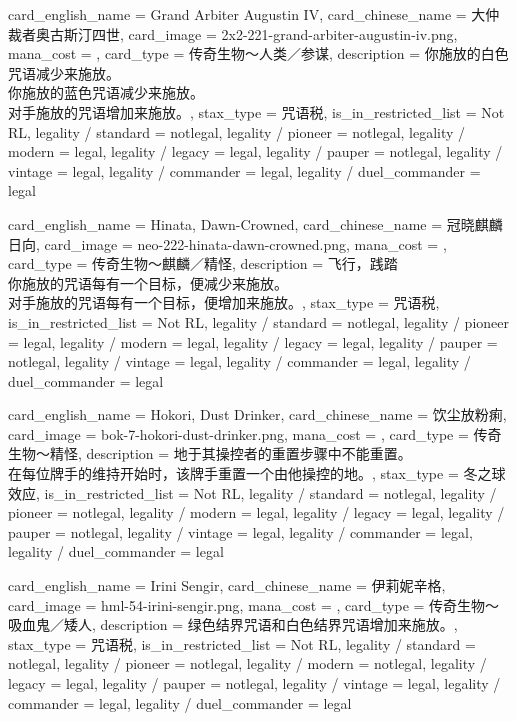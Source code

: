 \documentclass[lang = cn, color = black, 10pt]{AllThatStax}
\begin{document}
\card
{
	card_english_name = {Grand Arbiter Augustin IV},
	card_chinese_name = {大仲裁者奥古斯汀四世},
	card_image = 2x2-221-grand-arbiter-augustin-iv.png,
	mana_cost = ,
	card_type = 传奇生物～人类／参谋,
	description = {你施放的白色咒语减少来施放。\\
你施放的蓝色咒语减少来施放。\\
对手施放的咒语增加来施放。},
	stax_type = 咒语税,
	is_in_restricted_list = Not RL,
	legality / standard = notlegal,
	legality / pioneer = notlegal,
	legality / modern = legal,
	legality / legacy = legal,
	legality / pauper = notlegal,
	legality / vintage = legal,
	legality / commander = legal,
	legality / duel_commander = legal
}

\card
{
	card_english_name = {Hinata, Dawn-Crowned},
	card_chinese_name = {冠晓麒麟日向},
	card_image = neo-222-hinata-dawn-crowned.png,
	mana_cost = ,
	card_type = 传奇生物～麒麟／精怪,
	description = {飞行，践踏\\
你施放的咒语每有一个目标，便减少来施放。\\
对手施放的咒语每有一个目标，便增加来施放。},
	stax_type = 咒语税,
	is_in_restricted_list = Not RL,
	legality / standard = notlegal,
	legality / pioneer = legal,
	legality / modern = legal,
	legality / legacy = legal,
	legality / pauper = notlegal,
	legality / vintage = legal,
	legality / commander = legal,
	legality / duel_commander = legal
}

\card
{
	card_english_name = {Hokori, Dust Drinker},
	card_chinese_name = {饮尘放粉痢},
	card_image = bok-7-hokori-dust-drinker.png,
	mana_cost = ,
	card_type = 传奇生物～精怪,
	description = {地于其操控者的重置步骤中不能重置。\\
在每位牌手的维持开始时，该牌手重置一个由他操控的地。},
	stax_type = 冬之球效应,
	is_in_restricted_list = Not RL,
	legality / standard = notlegal,
	legality / pioneer = notlegal,
	legality / modern = legal,
	legality / legacy = legal,
	legality / pauper = notlegal,
	legality / vintage = legal,
	legality / commander = legal,
	legality / duel_commander = legal
}

\card
{
	card_english_name = {Irini Sengir},
	card_chinese_name = {伊莉妮辛格},
	card_image = hml-54-irini-sengir.png,
	mana_cost = ,
	card_type = 传奇生物～吸血鬼／矮人,
	description = {绿色结界咒语和白色结界咒语增加来施放。},
	stax_type = 咒语税,
	is_in_restricted_list = Not RL,
	legality / standard = notlegal,
	legality / pioneer = notlegal,
	legality / modern = notlegal,
	legality / legacy = legal,
	legality / pauper = notlegal,
	legality / vintage = legal,
	legality / commander = legal,
	legality / duel_commander = legal
}
\end{document}
